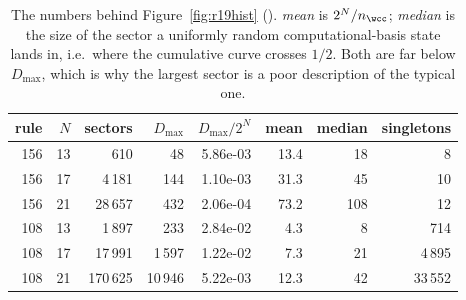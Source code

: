 \begin{table}[htbp]
\centering
\small
\begin{tabular}{rrrrrrrr}
\toprule
rule & $N$ & sectors & $D_{\max}$ & $D_{\max}/2^N$ & mean & median & singletons \\
\midrule
156 & 13 & 610 & 48 & 5.86e-03 & 13.4 & 18 & 8 \\
156 & 17 & 4\,181 & 144 & 1.10e-03 & 31.3 & 45 & 10 \\
156 & 21 & 28\,657 & 432 & 2.06e-04 & 73.2 & 108 & 12 \\
108 & 13 & 1\,897 & 233 & 2.84e-02 & 4.3 & 8 & 714 \\
108 & 17 & 17\,991 & 1\,597 & 1.22e-02 & 7.3 & 21 & 4\,895 \\
108 & 21 & 170\,625 & 10\,946 & 5.22e-03 & 12.3 & 42 & 33\,552 \\
\bottomrule
\end{tabular}
\caption{The numbers behind Figure~\ref{fig:r19hist} (). \emph{mean} is $2^N/n_{\wcc}$; \emph{median} is the size of the sector a uniformly random computational-basis state lands in, i.e.\ where the cumulative curve crosses $1/2$. Both are far below $D_{\max}$, which is why the largest sector is a poor description of the typical one.}
\label{tab:r19sizes}
\end{table}
